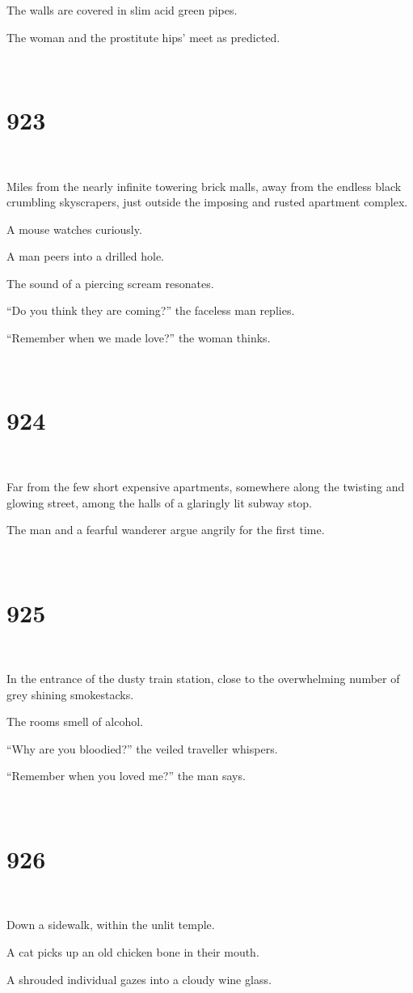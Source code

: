 \documentclass{report}
\begin{document}
The walls are covered in slim acid green pipes.

The woman and the prostitute hips' meet as predicted.

~
\chapter*{923}
~

Miles from the nearly infinite towering brick malls, away from the endless black crumbling skyscrapers, just outside the imposing and rusted apartment complex.

A mouse watches curiously.

A man peers into a drilled hole.

The sound of a piercing scream resonates.

``Do you think they are coming?'' the faceless man replies.

``Remember when we made love?'' the woman thinks.

~
\chapter*{924}
~

Far from the few short expensive apartments, somewhere along the twisting and glowing street, among the halls of a glaringly lit subway stop.

The man and a fearful wanderer argue angrily for the first time.

~
\chapter*{925}
~

In the entrance of the dusty train station, close to the overwhelming number of grey shining smokestacks.

The rooms smell of alcohol.

``Why are you bloodied?'' the veiled traveller whispers.

``Remember when you loved me?'' the man says.

~
\chapter*{926}
~

Down a sidewalk, within the unlit temple.

A cat picks up an old chicken bone in their mouth.

A shrouded individual gazes into a cloudy wine glass.
\end{document}
